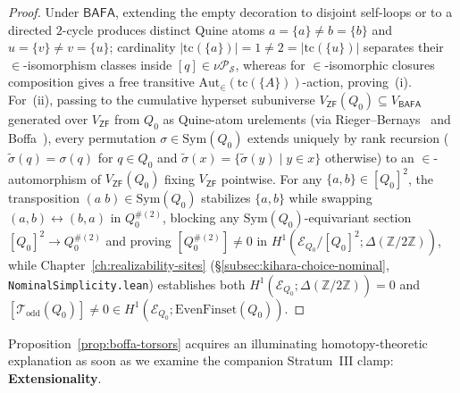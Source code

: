 \begin{proof}
Under $\mathsf{BAFA}$, extending the empty decoration to disjoint self-loops or to a directed $2$-cycle produces distinct Quine atoms $a = \{a\} \neq b = \{b\}$ and $u = \{v\} \neq v = \{u\}$; cardinality $|\mathrm{tc}(\{a\})| = 1 \neq 2 = |\mathrm{tc}(\{u\})|$ separates their $\in$-isomorphism classes inside $[q] \in \nu \mathcal{P}_{\mathcal{S}}$, whereas for $\in$-isomorphic closures composition gives a free transitive $\mathrm{Aut}_\in(\mathrm{tc}(\{A\}))$-action, proving~(i). For~(ii), passing to the cumulative hyperset subuniverse $V_{\mathsf{ZF}}(Q_0) \subseteq V_{\mathsf{BAFA}}$ generated over $V_{\mathsf{ZF}}$ from $Q_0$ as Quine-atom urelements (via Rieger--Bernays~\cite{Bernays54,Rieger57} and Boffa~\cite{Boffa69}), every permutation $\sigma \in \mathrm{Sym}(Q_0)$ extends uniquely by rank recursion ($\tilde{\sigma}(q) = \sigma(q)$ for $q \in Q_0$ and $\tilde{\sigma}(x) = \{\tilde{\sigma}(y) \mid y \in x\}$ otherwise) to an $\in$-automorphism of $V_{\mathsf{ZF}}(Q_0)$ fixing $V_{\mathsf{ZF}}$ pointwise. For any $\{a, b\} \in [Q_0]^2$, the transposition $(a\;b) \in \mathrm{Sym}(Q_0)$ stabilizes $\{a, b\}$ while swapping $(a, b) \leftrightarrow (b, a)$ in $Q_0^{\#(2)}$, blocking any $\mathrm{Sym}(Q_0)$-equivariant section $[Q_0]^2 \to Q_0^{\#(2)}$ and proving $[Q_0^{\#(2)}] \neq 0$ in $H^1(\mathcal{E}_{Q_0}/[Q_0]^2; \Delta(\mathbb{Z}/2\mathbb{Z}))$, while Chapter~\ref{ch:realizability-sites} (\S\ref{subsec:kihara-choice-nominal}, \texttt{NominalSimplicity.lean}) establishes both $H^1(\mathcal{E}_{Q_0}; \Delta(\mathbb{Z}/2\mathbb{Z})) = 0$ and $[\mathcal{T}_{\mathrm{odd}}(Q_0)] \neq 0 \in H^1(\mathcal{E}_{Q_0}; \mathrm{EvenFinset}(Q_0))$.
\end{proof}

Proposition~\ref{prop:boffa-torsors} acquires an illuminating homotopy-theoretic explanation as soon as we examine the companion Stratum~III clamp: \textbf{Extensionality}.

